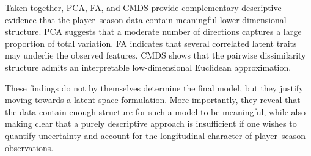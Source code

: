 Taken together, PCA, FA, and CMDS provide complementary descriptive evidence that the player--season data contain meaningful lower-dimensional structure. PCA suggests that a moderate number of directions captures a large proportion of total variation. FA indicates that several correlated latent traits may underlie the observed features. CMDS shows that the pairwise dissimilarity structure admits an interpretable low-dimensional Euclidean approximation.

These findings do not by themselves determine the final model, but they justify moving towards a latent-space formulation. More importantly, they reveal that the data contain enough structure for such a model to be meaningful, while also making clear that a purely descriptive approach is insufficient if one wishes to quantify uncertainty and account for the longitudinal character of player--season observations.